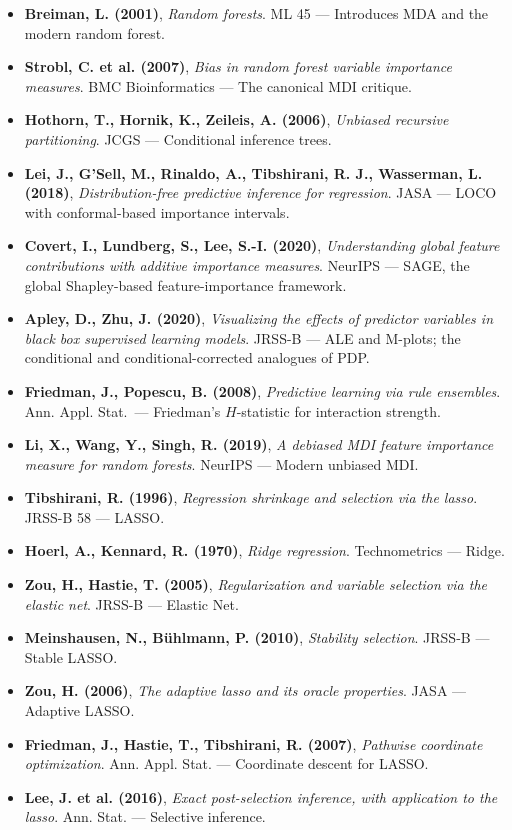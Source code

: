 \documentclass{article}
\providecommand{\tightlist}{\setlength{\itemsep}{0pt}\setlength{\parskip}{0pt}}
\begin{document}
\begin{itemize}
\tightlist
\item
  \textbf{Breiman, L. (2001)}, \emph{Random forests}. ML 45 ---
  Introduces MDA and the modern random forest.
\item
  \textbf{Strobl, C. et al. (2007)}, \emph{Bias in random forest
  variable importance measures}. BMC Bioinformatics --- The canonical
  MDI critique.
\item
  \textbf{Hothorn, T., Hornik, K., Zeileis, A. (2006)}, \emph{Unbiased
  recursive partitioning}. JCGS --- Conditional inference trees.
\item
  \textbf{Lei, J., G'Sell, M., Rinaldo, A., Tibshirani, R. J.,
  Wasserman, L. (2018)}, \emph{Distribution-free predictive inference
  for regression}. JASA --- LOCO with conformal-based importance
  intervals.
\item
  \textbf{Covert, I., Lundberg, S., Lee, S.-I. (2020)}, \emph{Understanding
  global feature contributions with additive importance measures}.
  NeurIPS --- SAGE, the global Shapley-based feature-importance
  framework.
\item
  \textbf{Apley, D., Zhu, J. (2020)}, \emph{Visualizing the effects of
  predictor variables in black box supervised learning models}. JRSS-B
  --- ALE and M-plots; the conditional and conditional-corrected
  analogues of PDP.
\item
  \textbf{Friedman, J., Popescu, B. (2008)}, \emph{Predictive learning
  via rule ensembles}. Ann. Appl. Stat.\ --- Friedman's \(H\)-statistic
  for interaction strength.
\item
  \textbf{Li, X., Wang, Y., Singh, R. (2019)}, \emph{A debiased MDI
  feature importance measure for random forests}. NeurIPS --- Modern
  unbiased MDI.
\item
  \textbf{Tibshirani, R. (1996)}, \emph{Regression shrinkage and
  selection via the lasso}. JRSS-B 58 --- LASSO.
\item
  \textbf{Hoerl, A., Kennard, R. (1970)}, \emph{Ridge regression}.
  Technometrics --- Ridge.
\item
  \textbf{Zou, H., Hastie, T. (2005)}, \emph{Regularization and variable
  selection via the elastic net}. JRSS-B --- Elastic Net.
\item
  \textbf{Meinshausen, N., Bühlmann, P. (2010)}, \emph{Stability
  selection}. JRSS-B --- Stable LASSO.
\item
  \textbf{Zou, H. (2006)}, \emph{The adaptive lasso and its oracle
  properties}. JASA --- Adaptive LASSO.
\item
  \textbf{Friedman, J., Hastie, T., Tibshirani, R. (2007)},
  \emph{Pathwise coordinate optimization}. Ann. Appl. Stat. ---
  Coordinate descent for LASSO.
\item
  \textbf{Lee, J. et al. (2016)}, \emph{Exact post-selection inference,
  with application to the lasso}. Ann. Stat. --- Selective inference.
\end{itemize}
\end{document}
